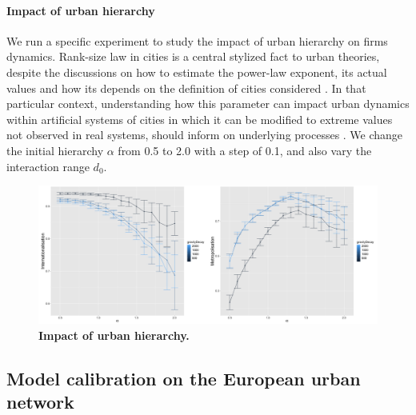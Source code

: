 \documentclass[10pt,letterpaper]{article}
\begin{document}
\paragraph{Impact of urban hierarchy}

We run a specific experiment to study the impact of urban hierarchy on firms dynamics. Rank-size law in cities is a central stylized fact to urban theories, despite the discussions on how to estimate the power-law exponent, its actual values \cite{cottineau2017metazipf} and how its depends on the definition of cities considered \cite{corral2020truncated}. In that particular context, understanding how this parameter can impact urban dynamics within artificial systems of cities in which it can be modified to extreme values not observed in real systems, should inform on underlying processes \cite{raimbault2019space}. We change the initial hierarchy $\alpha$ from 0.5 to 2.0 with a step of 0.1, and also vary the interaction range $d_0$.



\begin{figure}
    \begin{center}
        \includegraphics[width=\linewidth]{figures/Fig7.png}
    \end{center}
    \caption{\textbf{Impact of urban hierarchy.}\label{fig:fig7}}
\end{figure}



\subsection*{Model calibration on the European urban network}
\end{document}
